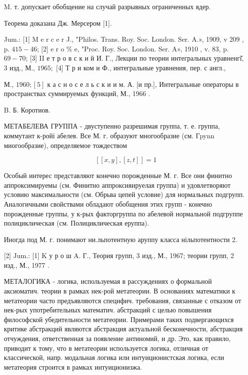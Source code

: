 \documentclass[10pt]{article}
\begin{document}
M. т. допускает обобщение на случай разрывных ограниченных ядер.



Теорема доказана Дж. Мерсером [1].



Jum.: [1] M e r c e r J., "Philos. Trans. Roy. Soc. London. Ser. A.», 1909, v 209 , p. $415-46$; [2] e r o \% e, "Proc. Roy. Soc. London. Ser. A», 1910 , v. 83, p. $69-70$; [3] II е т р о в с к и й И. Г., Лекции по теории интегральных уравненгї̆, 3 изд., М., $1965 ;$ [4] Т р и ком и Ф., интегральные уравнения, пер. с англ.,

М., $1960 ;[5]$ к а с н о с е л ь с к и и м. А. [и пр.], Интегральные операторы в пространствах суммируемых функций, М., 1966 .



B. Б. Коротиов.



МЕТАБЕЛЕВА ГРУППА - двуступенно разрешимая группа, т. е. группа, коммутант к-ройі абелев. Все М. г. об́разуют многообразие (см. Гpynn миогообразие), определяемое тождеством



\[

[[x, y],[z, t]]=1

\]



Особый интерес представляют конечно порожденные М. г. Все они финитно аппроксимируемы (см. Финитно аппроксияируелая группа) и удовлетворяют условию максимальности (см. Обрьва цепей условие) для нормальных подгрупп. Аналогичными свойствами обладают обобщения этих групп - конечно порожденные группы, у к-рых факторгруппа по абелевой нормальной подгруппе полициклическая (см. Полициклическая еруппа).



Иногда под М. г. понимают ни.льпотентную аруппу класса нільпотентности 2.



[2] Jum.: [1] K у р о ш A. Г., Теория групп, 3 изд., М., 1967; теории групп, 2 изд., М., 1977 .



МЕТАЛОГИКА - логика, используемая в рассуждениях о формальной аксиоматич. теории в рамках нек-рой метатеории. В основаниях математики к метатеории часто предъявляются специфич. требования, связанные с отказом от нек-рых употребительных математич. абстракций с целью повышения философской убедительности метатеории. Примерами таких подвергающихся критике абстракций являются абстракция актуальной бесконечности, абстракция отчуждения, ответственная за появление антиномий, и др. Это, как правило, приводит к тому, что в метатеории используется логика, отличная от классической, напр. модальная логика или интуиционистская логика, если метатеория строится в рамках интуиционизжа.
\end{document}
